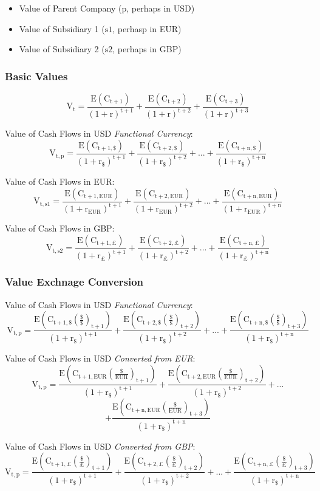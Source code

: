 \documentclass[11pt, english]{article}
\begin{document}
	\begin{itemize}
	\setlength\itemsep{0cm}
		\item Value of Parent Company ($\mathrm{p}$, perhaps in USD)
		\item Value of Subsidiary 1 ($\mathrm{s1}$, perhasp in EUR)
		\item Value of Subsidiary 2 ($\mathrm{s2}$, perhaps in GBP)
	\end{itemize}

		\subsubsection{Basic Values}
	
	$$\mathrm{V_t=\frac{E(C_{t+1})}{(1+r)^{t+1}}+\frac{E(C_{t+2})}{(1+r)^{t+2}}+\frac{E(C_{t+3})}{(1+r)^{t+3}}}$$

	Value of Cash Flows in USD \textit{Functional Currency}:
	$$\mathrm{V_{t,p}=\frac{E(C_{t+1,\$})}{(1+r_\$)^{t+1}}+\frac{E(C_{t+2,\$})}{(1+r_\$)^{t+2}}+...+\frac{E(C_{t+n,{\$}})}{(1+r_\$)^{t+n}}}$$

	Value of Cash Flows in EUR:
	$$\mathrm{V_{t,s1}=\frac{E(C_{t+1,EUR})}{(1+r_{EUR})^{t+1}}+\frac{E(C_{t+2,{EUR}})}{(1+r_{EUR})^{t+2}}+...+\frac{E(C_{t+n,{EUR}})}{(1+r_{EUR})^{t+n}}}$$

	Value of Cash Flows in GBP:
	$$\mathrm{V_{t,s2}=\frac{E(C_{t+1,\pounds})}{(1+r_\pounds)^{t+1}}+\frac{E(C_{t+2,\pounds})}{(1+r_\pounds)^{t+2}}+...+\frac{E(C_{t+n,{\pounds}})}{(1+r_\pounds)^{t+n}}}$$

		\subsubsection{Value Exchnage Conversion}

	Value of Cash Flows in USD \textit{Functional Currency}:
	$$\mathrm{V_{t,p}=\frac{E\left(C_{t+1,\$}\left(\frac{\$}{\$}\right)_{t+1}\right)}{(1+r_\$)^{t+1}}+\frac{E\left(C_{t+2,\$}\left(\frac{\$}{\$}\right)_{t+2}\right)}{(1+r_\$)^{t+2}}+...+\frac{E\left(C_{t+n,{\$}}\left(\frac{\$}{\$}\right)_{t+3}\right)}{(1+r_\$)^{t+n}}}$$

	Value of Cash Flows in USD \textit{Converted from EUR}:
	$$\mathrm{V_{t,p}=\frac{E\left(C_{t+1,EUR}\left(\frac{\$}{EUR}\right)_{t+1}\right)}{(1+r_\$)^{t+1}}+\frac{E\left(C_{t+2,EUR}\left(\frac{\$}{EUR}\right)_{t+2}\right)}{(1+r_\$)^{t+2}}+...}$$ $$\mathrm{+\frac{E\left(C_{t+n,{EUR}}\left(\frac{\$}{EUR}\right)_{t+3}\right)}{(1+r_\$)^{t+n}}}$$

	Value of Cash Flows in USD \textit{Converted from GBP}:
	$$\mathrm{V_{t,p}=\frac{E\left(C_{t+1,\pounds}\left(\frac{\$}{\pounds}\right)_{t+1}\right)}{(1+r_\$)^{t+1}}+\frac{E\left(C_{t+2,\pounds}\left(\frac{\$}{\pounds}\right)_{t+2}\right)}{(1+r_\$)^{t+2}}+...+\frac{E\left(C_{t+n,{\pounds}}\left(\frac{\$}{\pounds}\right)_{t+3}\right)}{(1+r_\$)^{t+n}}}$$
\end{document}
